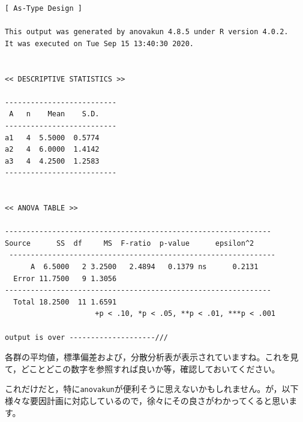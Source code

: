 \documentclass{ltjsarticle}
\begin{document}
\begin{tcolorbox}
    \begin{verbatim}
[ As-Type Design ]

This output was generated by anovakun 4.8.5 under R version 4.0.2.
It was executed on Tue Sep 15 13:40:30 2020.
    
     
<< DESCRIPTIVE STATISTICS >>
    
--------------------------
 A   n    Mean    S.D. 
--------------------------
a1   4  5.5000  0.5774 
a2   4  6.0000  1.4142 
a3   4  4.2500  1.2583 
--------------------------
    
    
<< ANOVA TABLE >>
    
--------------------------------------------------------------
Source      SS  df     MS  F-ratio  p-value      epsilon^2 
 --------------------------------------------------------------
      A  6.5000   2 3.2500   2.4894   0.1379 ns      0.2131 
  Error 11.7500   9 1.3056                                  
--------------------------------------------------------------
  Total 18.2500  11 1.6591                                  
                     +p < .10, *p < .05, **p < .01, ***p < .001

output is over --------------------///
\end{verbatim}
\end{tcolorbox}
各群の平均値，標準偏差および，分散分析表が表示されていますね。これを見て，どことどこの数字を参照すれば良いか等，確認しておいてください。

これだけだと，特に\texttt{anovakun}が便利そうに思えないかもしれません。が，以下様々な要因計画に対応しているので，徐々にその良さがわかってくると思います。
\end{document}
